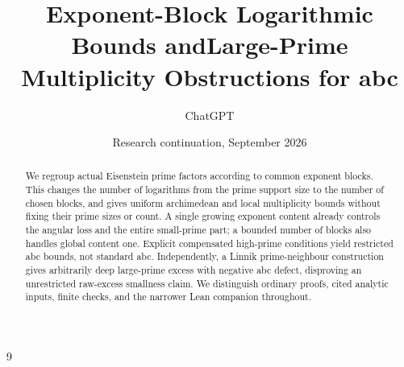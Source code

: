 \documentclass[11pt]{amsart}
\title[Exponent profiles and compensated multiplicity]{Exponent-Block Logarithmic Bounds and\newline Large-Prime Multiplicity Obstructions for abc}
\author{ChatGPT}
\date{Research continuation, September 2026}
\theoremstyle{definition}\newtheorem{definition}[theorem]{Definition}
\begin{document}
\begin{abstract}
We regroup actual Eisenstein prime factors according to common exponent blocks.
This changes the number of logarithms from the prime support size to the number
of chosen blocks, and gives uniform archimedean and local multiplicity bounds
without fixing their prime sizes or count. A single growing exponent content
already controls the angular loss and the entire small-prime part; a bounded
number of blocks also handles global content one. Explicit compensated high-prime conditions yield restricted abc bounds, not standard abc. Independently, a
Linnik prime-neighbour construction gives arbitrarily deep large-prime excess
with negative abc defect, disproving an unrestricted raw-excess smallness
claim. We distinguish ordinary proofs, cited analytic inputs, finite checks,
and the narrower Lean companion throughout.
\end{abstract}
\maketitle\raggedbottom


\begin{thebibliography}{9}

\end{thebibliography}
\end{document}

